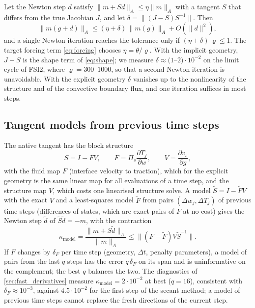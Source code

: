 \documentclass[11pt,a4paper]{article}
\theoremstyle{definition}
\theoremstyle{remark}
\newcommand{\Pis}{\Pi_{s}}
\begin{document}
Let the Newton step $d$ satisfy $\|m+Sd\|_A\le\eta\|m\|_A$ with a tangent $S$ that differs from the
true Jacobian $J$, and let $\delta=\|(J-S)S^{-1}\|$. Then
\begin{equation}\label{eq:newton_error}
  \|m(g+d)\|_A\le(\eta+\delta)\,\|m(g)\|_A+O(\|d\|^2),
\end{equation}
and a single Newton iteration reaches the tolerance only if $(\eta+\delta)\,\varrho\le1$. The target
forcing term \eqref{eq:forcing} chooses $\eta=\theta/\varrho$. With the implicit geometry,
$J-S$ is the shape term of \eqref{eq:shape}; we measure $\delta\approx(1$--$2)\cdot10^{-2}$ on the
limit cycle of FSI2, where $\varrho=300$--$1000$, so that a second Newton iteration is unavoidable.
With the explicit geometry $\delta$ vanishes up to the nonlinearity of the structure and of the
convective boundary flux, and one iteration suffices in most steps.

\subsection{Tangent models from previous time steps}\label{sec:structured_model}

The native tangent has the block structure
\begin{equation}\label{eq:block_structure}
  S=I-FV,\qquad F=\Pis\frac{\partial T_f}{\partial w},\qquad V=\frac{\partial v_s}{\partial g},
\end{equation}
with the fluid map $F$ (interface velocity to traction), which for the explicit geometry is the
same linear map for all evaluations of a time step, and the structure map $V$, which costs one
linearised structure solve. A model $\tilde S=I-\tilde FV$ with the exact $V$ and a least-squares
model $\tilde F$ from pairs $(\Delta w_j,\Delta T_j)$ of previous time steps (differences of states,
which are exact pairs of $F$ at no cost) gives the Newton step $\tilde d$ of
$\tilde S\tilde d=-m$, with the contraction
\begin{equation}\label{eq:model_contraction}
  \kappa_{\mathrm{model}}=\frac{\|m+S\tilde d\|_A}{\|m\|_A}
  \le\big\|(F-\tilde F)V\tilde S^{-1}\big\| .
\end{equation}
If $F$ changes by $\delta_F$ per time step (geometry, $\Delta t$, penalty parameters), a model of
pairs from the last $q$ steps has the error $q\,\delta_F$ on its span and is uninformative on the
complement; the best $q$ balances the two. The diagnostics of \cref{sec:fast_derivatives}
measure $\kappa_{\mathrm{model}}=2\cdot10^{-2}$ at best ($q=16$), consistent with
$\delta_F\approx10^{-3}$, against $4.5\cdot10^{-2}$ for the first step of the secant method; a model
of previous time steps cannot replace the fresh directions of the current step.
\end{document}
